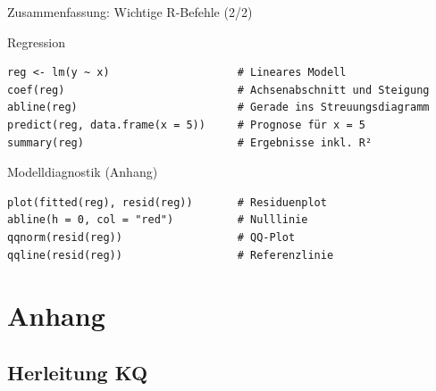 \documentclass[aspectratio=169,11pt]{beamer}
\begin{document}
\begin{frame}[fragile]{Zusammenfassung: Wichtige R-Befehle (2/2)}
  \begin{block}{Regression}
    \begin{lstlisting}
reg <- lm(y ~ x)                    # Lineares Modell
coef(reg)                           # Achsenabschnitt und Steigung
abline(reg)                         # Gerade ins Streuungsdiagramm
predict(reg, data.frame(x = 5))     # Prognose für x = 5
summary(reg)                        # Ergebnisse inkl. R²
\end{lstlisting}
  \end{block}

  \vspace{0.3cm}

  \begin{block}{Modelldiagnostik (Anhang)}
    \begin{lstlisting}
plot(fitted(reg), resid(reg))       # Residuenplot
abline(h = 0, col = "red")          # Nulllinie
qqnorm(resid(reg))                  # QQ-Plot
qqline(resid(reg))                  # Referenzlinie
\end{lstlisting}
  \end{block}
\end{frame}

\appendix
\section{Anhang}

\subsection{Herleitung KQ}
\end{document}
